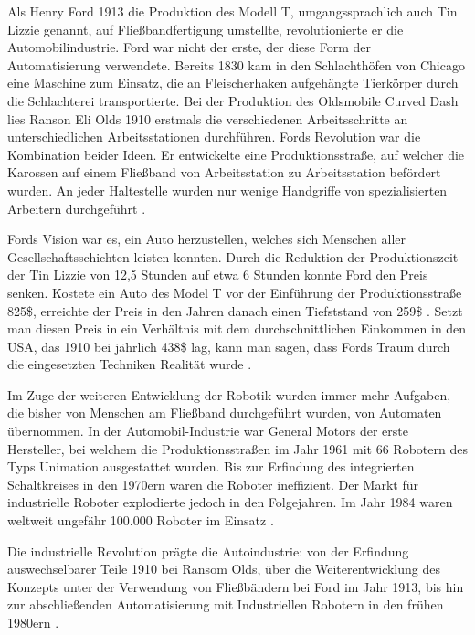 \documentclass[12pt,oneside,a4paper,parskip]{scrbook}
\begin{document}
Als Henry Ford 1913 die Produktion des Modell T, umgangssprachlich auch Tin Lizzie genannt, auf Fließbandfertigung umstellte, revolutionierte er die Automobilindustrie. Ford war nicht der erste, der diese Form der Automatisierung verwendete. Bereits 1830 kam in den Schlachthöfen von Chicago eine Maschine zum Einsatz, die an Fleischerhaken aufgehängte Tierkörper durch die Schlachterei transportierte. Bei der Produktion des Oldsmobile Curved Dash lies Ranson Eli Olds 1910 erstmals die verschiedenen Arbeitsschritte an unterschiedlichen Arbeitsstationen durchführen. Fords Revolution war die Kombination beider Ideen. Er entwickelte eine Produktionsstraße, auf welcher die Karossen auf einem Fließband von Arbeitsstation zu Arbeitsstation befördert wurden. An jeder Haltestelle wurden nur wenige Handgriffe von spezialisierten Arbeitern durchgeführt \cite{sagerso2008modelt}.

Fords Vision war es, ein Auto herzustellen, welches sich Menschen aller Gesellschaftsschichten leisten konnten. Durch die Reduktion der Produktionszeit der Tin Lizzie von 12,5 Stunden auf etwa 6 Stunden konnte Ford den Preis senken. Kostete ein Auto des Model T vor der Einführung der Produktionsstraße 825\$, erreichte der Preis in den Jahren danach einen Tiefststand von 259\$ \cite{reichlesz2010modelt}. Setzt man diesen Preis in ein Verhältnis mit dem durchschnittlichen Einkommen in den USA, das 1910 bei jährlich 438\$ lag, kann man sagen, dass Fords Traum durch die eingesetzten Techniken Realität wurde \cite{usembassyodnumbers}.

Im Zuge der weiteren Entwicklung der Robotik wurden immer mehr Aufgaben, die bisher von Menschen am Fließband durchgeführt wurden, von Automaten übernommen. In der Automobil-Industrie war General Motors der erste Hersteller, bei welchem die Produktionsstraßen im Jahr 1961 mit 66 Robotern des Typs Unimation ausgestattet wurden. Bis zur Erfindung des integrierten Schaltkreises in den 1970ern waren die Roboter ineffizient. Der Markt für industrielle Roboter explodierte jedoch in den Folgejahren. Im Jahr 1984 waren weltweit ungefähr 100.000 Roboter im Einsatz \cite{czaeis2000genprog, wallen2008robohistory}.

Die industrielle Revolution prägte die Autoindustrie: von der Erfindung auswechselbarer Teile 1910 bei Ransom Olds, über die Weiterentwicklung des Konzepts unter der Verwendung von Fließbändern bei Ford im Jahr 1913, bis hin zur abschließenden Automatisierung mit Industriellen Robotern in den frühen 1980ern \cite{czaeis2000genprog}.
\end{document}
